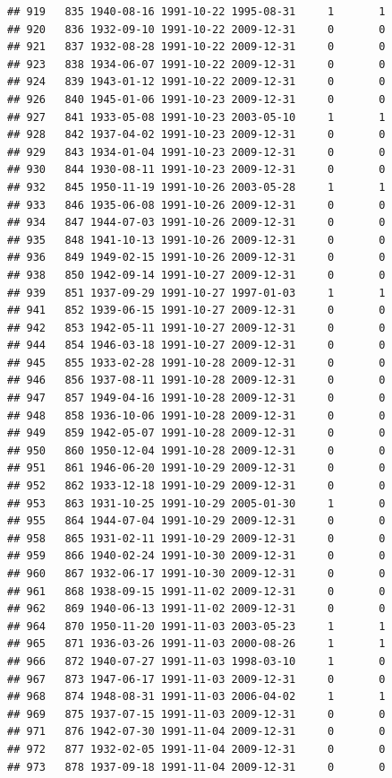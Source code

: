 \documentclass[
]{book}
\theoremstyle{definition}
\theoremstyle{definition}
\theoremstyle{definition}
\theoremstyle{definition}
\theoremstyle{remark}
\begin{document}
\begin{verbatim}
## 919   835 1940-08-16 1991-10-22 1995-08-31     1       1
## 920   836 1932-09-10 1991-10-22 2009-12-31     0       0
## 921   837 1932-08-28 1991-10-22 2009-12-31     0       0
## 923   838 1934-06-07 1991-10-22 2009-12-31     0       0
## 924   839 1943-01-12 1991-10-22 2009-12-31     0       0
## 926   840 1945-01-06 1991-10-23 2009-12-31     0       0
## 927   841 1933-05-08 1991-10-23 2003-05-10     1       1
## 928   842 1937-04-02 1991-10-23 2009-12-31     0       0
## 929   843 1934-01-04 1991-10-23 2009-12-31     0       0
## 930   844 1930-08-11 1991-10-23 2009-12-31     0       0
## 932   845 1950-11-19 1991-10-26 2003-05-28     1       1
## 933   846 1935-06-08 1991-10-26 2009-12-31     0       0
## 934   847 1944-07-03 1991-10-26 2009-12-31     0       0
## 935   848 1941-10-13 1991-10-26 2009-12-31     0       0
## 936   849 1949-02-15 1991-10-26 2009-12-31     0       0
## 938   850 1942-09-14 1991-10-27 2009-12-31     0       0
## 939   851 1937-09-29 1991-10-27 1997-01-03     1       1
## 941   852 1939-06-15 1991-10-27 2009-12-31     0       0
## 942   853 1942-05-11 1991-10-27 2009-12-31     0       0
## 944   854 1946-03-18 1991-10-27 2009-12-31     0       0
## 945   855 1933-02-28 1991-10-28 2009-12-31     0       0
## 946   856 1937-08-11 1991-10-28 2009-12-31     0       0
## 947   857 1949-04-16 1991-10-28 2009-12-31     0       0
## 948   858 1936-10-06 1991-10-28 2009-12-31     0       0
## 949   859 1942-05-07 1991-10-28 2009-12-31     0       0
## 950   860 1950-12-04 1991-10-28 2009-12-31     0       0
## 951   861 1946-06-20 1991-10-29 2009-12-31     0       0
## 952   862 1933-12-18 1991-10-29 2009-12-31     0       0
## 953   863 1931-10-25 1991-10-29 2005-01-30     1       0
## 955   864 1944-07-04 1991-10-29 2009-12-31     0       0
## 958   865 1931-02-11 1991-10-29 2009-12-31     0       0
## 959   866 1940-02-24 1991-10-30 2009-12-31     0       0
## 960   867 1932-06-17 1991-10-30 2009-12-31     0       0
## 961   868 1938-09-15 1991-11-02 2009-12-31     0       0
## 962   869 1940-06-13 1991-11-02 2009-12-31     0       0
## 964   870 1950-11-20 1991-11-03 2003-05-23     1       1
## 965   871 1936-03-26 1991-11-03 2000-08-26     1       1
## 966   872 1940-07-27 1991-11-03 1998-03-10     1       0
## 967   873 1947-06-17 1991-11-03 2009-12-31     0       0
## 968   874 1948-08-31 1991-11-03 2006-04-02     1       1
## 969   875 1937-07-15 1991-11-03 2009-12-31     0       0
## 971   876 1942-07-30 1991-11-04 2009-12-31     0       0
## 972   877 1932-02-05 1991-11-04 2009-12-31     0       0
## 973   878 1937-09-18 1991-11-04 2009-12-31     0       0

\end{verbatim}
\end{document}

